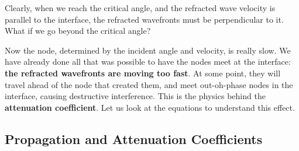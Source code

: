 Clearly, when we reach the critical angle, and the refracted wave velocity is parallel to the interface, the refracted wavefronts must be perpendicular to it. What if we go beyond the critical angle?

Now the node, determined by the incident angle and velocity, is really slow. We have already done all that was possible to have the nodes meet at the interface: \textbf{the refracted wavefronts are moving too fast}. At some point, they will travel ahead of the node that created them, and meet out-oh-phase nodes in the interface, causing destructive interference. This is the physics behind the \textbf{attenuation coefficient}. Let us look at the equations to understand this effect.

\subsection*{Propagation and Attenuation Coefficients}

